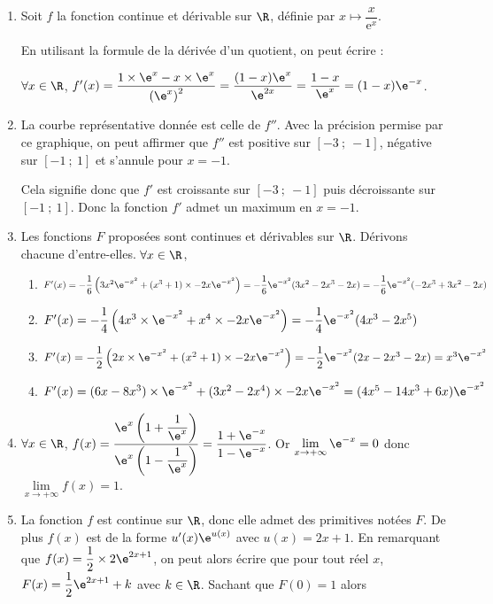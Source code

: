 \medskip

\begin{enumerate}
	\item Soit $f$ la fonction continue et dérivable sur $\R$, définie par $x \longmapsto \dfrac{x}{\text{e}^x}$.
	
	En utilisant la formule de la dérivée d'un quotient, on peut écrire :
	
	$\forall x \in \R$, $f'(x)=\dfrac{1\times \e^{x}-x\times \e^x}{\left(\e^x\right)^2}=\dfrac{(1-x)\e^x}{\e^{2x}}=\dfrac{1-x}{\e^x}=(1-x)\e^{-x}$. \hfill {}
	\item La courbe représentative donnée est celle de $f''$. Avec la précision permise par ce graphique, on peut affirmer que $f''$ est positive sur $[-3~;~-1]$, négative sur $[-1~;~1]$ et s'annule pour $x= - 1$. 
	
Cela signifie donc que $f'$ est croissante sur $[-3~;~-1]$ puis décroissante sur $[-1~;~1]$. Donc la fonction $f'$ admet un maximum en $x = -1$. \hfill {}
	\item Les fonctions $F$ proposées sont continues et dérivables sur $\R$. Dérivons chacune d'entre-elles. $\forall x \in \R$, 
	\begin{enumerate}
		\item $F'(x)=-\dfrac{1}{6}\left(3x^2\e^{-x^2}+(x^3+1)\times -2x\e^{-x^2}\right)=-\dfrac{1}{6}\e^{-x^2}(3x^2-2x^3-2x)\\=-\dfrac{1}{6}\e^{-x^2}(-2x^3+3x^2-2x)$
		\item $F'(x)=-\dfrac{1}{4}\left(4x^3 \times \e^{-x^2}+x^4\times -2x\e^{-x^2}\right)=-\dfrac{1}{4}\e^{-x^2}(4x^3-2x^5)$
		\item $F'(x)=-\dfrac{1}{2}\left(2x\times \e^{-x^2}+(x^2+1)\times -2x\e^{-x^2}\right)=-\dfrac{1}{2}\e^{-x^2}(2x-2x^3-2x)=x^3\e^{-x^2}$
		\item $F'(x)=(6x-8x^3)\times \e^{-x^2}+(3x^2-2x^4)\times -2x\e^{-x^2}= (4x^5-14x^3+6x)\e^{-x^2} $
	\end{enumerate}
\hfill {}
	\item $\forall x \in \R$, $f(x)=\dfrac{\e^x\left(1+\dfrac{1}{\e^x}\right)}{\e^x\left(1-\dfrac{1}{\e^x}\right)}=\dfrac{1+\e^{-x}}{1-\e^{-x}}$. Or $\displaystyle\lim\limits_{x \rightarrow +\infty} \e^{-x}=0$ donc $\displaystyle\lim\limits_{x \rightarrow +\infty} f(x)=1$. \hfill {}
	\item La fonction $f$ est continue sur $\R$, donc elle admet des primitives notées $F$. De plus $f(x)$ est de la forme $u'(x)\e^{u(x)}$ avec $u(x)=2x+1$. En remarquant que $f(x)=\dfrac{1}{2} \times 2\e^{2x+1}$, on peut alors écrire que pour tout réel $x$, $F(x)=\dfrac{1}{2}\e^{2x+1}+k$ avec $k\in \R$. Sachant que $F(0)=1$ alors
	

\end{enumerate}
